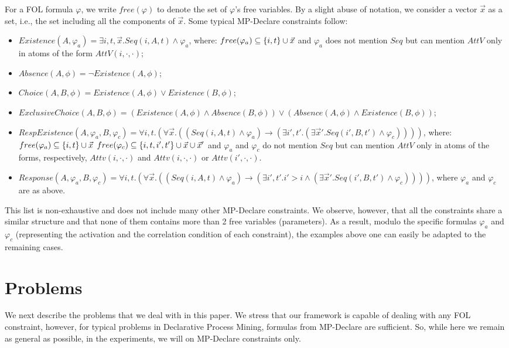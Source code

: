 For a FOL formula $\varphi$, we write
$free(\varphi)$ to denote the set of $\varphi$'s free variables.
By a slight abuse of notation, we consider a vector $\vec x$
as a set, i.e., the set including all the components
of $\vec x$. Some typical MP-Declare constraints follow:

\begin{itemize}
	\item $Existence(A,\varphi_a)=
		\exists i,t,\vec x.Seq(i,A,t)\land\varphi_a$,
		where:
		$free(\varphi_a)\subseteq\{i,t\}\cup\vec x$
		and
		$\varphi_a$ does not mention $Seq$
		but
		can mention $AttV$ only in atoms of the form
		$AttV(i,\cdot,\cdot)$;
	\item $Absence(A,\phi)=\lnot Existence(A,\phi)$;
	\item $Choice(A,B,\phi)=Existence(A,\phi)\lor Existence(B,\phi)$;
	\item $ExclusiveChoice(A,B,\phi)=
		(Existence(A,\phi)\land Absence(B,\phi))\lor
		(Absence(A,\phi)\land Existence(B,\phi))$;
		
	\item $RespExistence(A,\varphi_a,B,\varphi_c)=
		\forall i,t.(
			\forall\vec x.(
				(Seq(i,A,t)\land \varphi_a)
					\rightarrow
				(\exists i',t'.(
					\exists \vec x'.
						Seq(i',B,t')\land\varphi_c)
				)
			)
		)
		$,
		where:
		$free(\varphi_a)\subseteq\{i,t\}\cup\vec x$
		$free(\varphi_c)\subseteq\{i,t,i',t'\}\cup\vec x\cup\vec x'$
		and
		$\varphi_a$ and $\varphi_c$ do not mention
		$Seq$ but can mention $AttV$ only in atoms
		of the forms, respectively,
		$Attv(i,\cdot, \cdot)$ and
		$Attv(i,\cdot, \cdot)$ or $Attv(i',\cdot, \cdot)$.
	\item $Response(A,\varphi_a,B,\varphi_c)=
		\forall i,t.(
			\forall\vec x.(
				(Seq(i,A,t)\land \varphi_a)
					\rightarrow
				(\exists i',t'.i'>i\land(
					\exists\vec x'.
						Seq(i',B,t')\land\varphi_c)
				)
			)
		)
		$, where $\varphi_a$ and $\varphi_c$ are as above.	
\end{itemize}
This list is non-exhaustive and does not
include many other MP-Declare constraints.
We observe, however, that all the constraints share a similar
structure and that none of them contains more than 2
free variables (parameters). As a result, modulo the
specific formulas $\varphi_a$ and $\varphi_c$ (representing the activation and the correlation condition of each constraint),
the examples above one can easily be adapted to the
remaining cases.

\section{Problems}
We next describe the problems that we deal with in this paper.
We stress that our framework is capable of dealing with any
FOL constraint, however, for typical problems in Declarative
Process Mining, formulas from MP-Declare are sufficient. So, while
here we remain as general as possible, in the experiments,
we will on MP-Declare constraints only.



